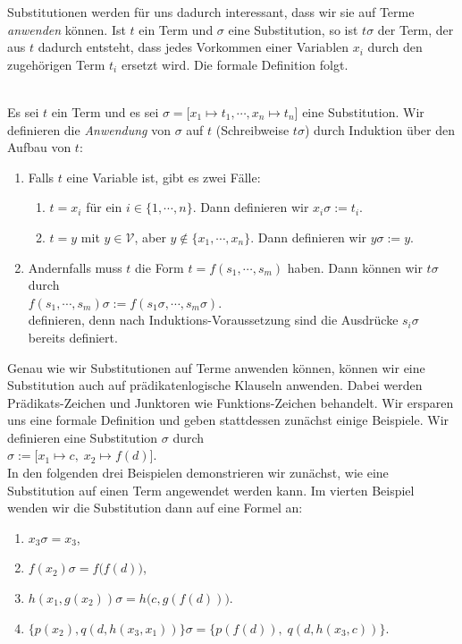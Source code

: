 \noindent
Substitutionen werden f\"{u}r uns dadurch interessant, dass wir sie auf Terme {\emph{\color{blue}anwenden}}
k\"{o}nnen.  Ist $t$ ein Term und  
$\sigma$ eine Substitution, so ist $t\sigma$ der Term, der aus $t$ dadurch entsteht, dass jedes Vorkommen einer Variablen
$x_i$ durch den zugeh\"{o}rigen Term $t_i$ ersetzt wird.  Die formale Definition folgt. 
\begin{Definition}
\hspace*{\fill} \\
Es sei $t$ ein Term und es sei $\sigma = \bigl[ x_1 \mapsto t_1, \cdots, x_n \mapsto t_n \bigr]$
eine Substitution. Wir definieren die \emph{Anwendung} von $\sigma$ auf $t$ (Schreibweise $t\sigma$) durch Induktion \"{u}ber
den Aufbau von $t$: 
\begin{enumerate}
\item Falls $t$ eine Variable ist, gibt es zwei F\"{a}lle:
  \begin{enumerate}
  \item $t = x_i$ f\"{u}r ein $i\in\{1,\cdots,n\}$.  Dann definieren wir \quad  $x_i\sigma := t_i$.
  \item $t = y$ mit $y\in\mathcal{V}$, aber $y \not\in \{x_1,\cdots,x_n\}$. Dann definieren wir \quad $y\sigma := y$.
  \end{enumerate}
\item Andernfalls muss $t$ die Form $t= f(s_1,\cdots,s_m)$ haben. Dann k\"{o}nnen wir $t\sigma$ durch \\[0.2cm]
      \hspace*{1.3cm} $f(s_1, \cdots, s_m)\sigma := f(s_1\sigma, \cdots, s_m\sigma)$. \\[0.2cm]
      definieren, denn nach Induktions-Voraussetzung sind die Ausdr\"{u}cke $s_i\sigma$ bereits definiert.      
      \eox
\end{enumerate}
\end{Definition}

Genau wie wir Substitutionen auf Terme anwenden k\"{o}nnen, k\"{o}nnen wir eine Substitution
auch auf pr\"{a}dikatenlogische Klauseln anwenden.  Dabei werden Pr\"{a}dikats-Zeichen und
Junktoren wie Funktions-Zeichen behandelt.
Wir ersparen uns eine formale Definition und geben stattdessen zun\"{a}chst einige Beispiele. 
Wir definieren eine Substitution $\sigma$ durch \\[0.2cm]
\hspace*{1.3cm} $\sigma := \big[ x_1 \mapsto c,\; x_2 \mapsto f(d) \big]$. \\[0.2cm]
In den folgenden drei Beispielen demonstrieren wir zun\"{a}chst, wie eine Substitution
auf einen Term angewendet werden kann.  Im vierten Beispiel wenden wir die Substitution
dann auf eine Formel an:
\begin{enumerate}
\item $x_3\sigma = x_3$,
\item $f(x_2)\sigma = f\bigl(f(d)\bigr)$,
\item $h(x_1,g(x_2))\sigma = h\bigl(c,g(f(d))\bigr)$.
\item $\bigl\{ p(x_2), q(d,h(x_3,x_1))\bigr\}\sigma = \bigl\{ p(f(d)),\; q(d,h(x_3,c))\bigr\}$.
\end{enumerate}


